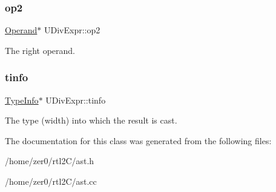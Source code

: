 \subsubsection{\texorpdfstring{op2}{op2}}
{\footnotesize\ttfamily \hyperlink{class_operand}{Operand}$\ast$ U\+Div\+Expr\+::op2\hspace{0.3cm}{\ttfamily [protected]}}

The right operand. \mbox{\label{class_u_div_expr_a90230f48a89ec295ce5e00bf1c53da9a}} 
\subsubsection{\texorpdfstring{tinfo}{tinfo}}
{\footnotesize\ttfamily \hyperlink{class_type_info}{Type\+Info}$\ast$ U\+Div\+Expr\+::tinfo\hspace{0.3cm}{\ttfamily [protected]}}

The type (width) into which the result is cast. 

The documentation for this class was generated from the following files\+:\begin{DoxyCompactItemize}
\item 
/home/zer0/rtl2\+C/ast.\+h\item 
/home/zer0/rtl2\+C/ast.\+cc\end{DoxyCompactItemize}
